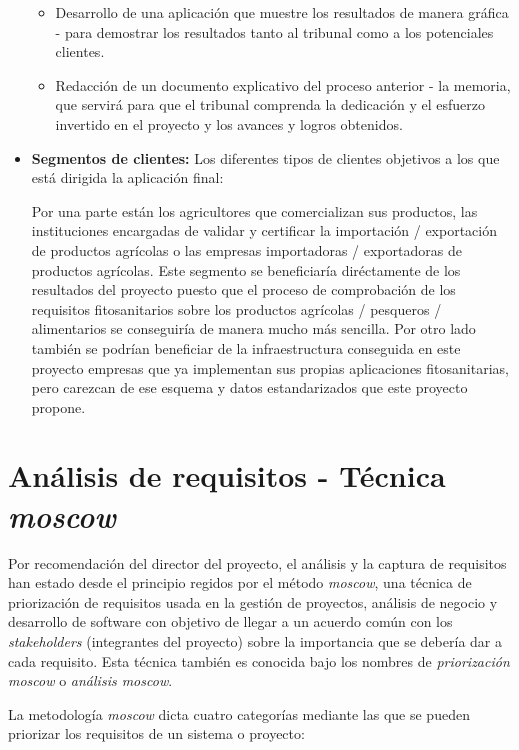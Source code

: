 \begin{itemize}
\begin{itemize}
\item Desarrollo de una aplicación que muestre los resultados de manera gráfica - para demostrar los resultados tanto al tribunal como a los potenciales clientes.
\item Redacción de un documento explicativo del proceso anterior - la memoria, que servirá para que el tribunal comprenda la dedicación y el esfuerzo invertido en el proyecto y los avances y logros obtenidos.
\end{itemize}
\item \textbf{Segmentos de clientes:} Los diferentes tipos de clientes objetivos a los que está dirigida la aplicación final: \par Por una parte están los  agricultores que comercializan sus productos, las instituciones encargadas de validar y certificar la importación / exportación  de productos agrícolas o las empresas importadoras / exportadoras de productos agrícolas. Este segmento se beneficiaría diréctamente de los resultados del proyecto puesto que el proceso de comprobación de los requisitos fitosanitarios sobre los productos agrícolas / pesqueros / alimentarios se conseguiría de manera mucho más sencilla. Por otro lado también se podrían beneficiar de la infraestructura conseguida en este proyecto empresas que ya implementan sus propias aplicaciones fitosanitarias, pero carezcan de ese esquema y datos estandarizados que este proyecto propone.



\end{itemize}


\section{Análisis de requisitos - Técnica \textit{\gls{moscow}}} \label{phytoscheme.requisitos}
\par 
Por recomendación del director del proyecto, el análisis y la captura de requisitos han estado desde el principio  regidos por el método \textit{\gls{moscow}}, una técnica de priorización de requisitos usada en la gestión de proyectos, análisis de negocio y desarrollo de software con objetivo de llegar a un acuerdo común con los \textit{stakeholders} (integrantes del proyecto) sobre la importancia que se debería dar a cada requisito. Esta técnica también es conocida bajo los nombres de \textit{priorización \gls{moscow}} o \textit{análisis \gls{moscow}}.
\par
La metodología \textit{\gls{moscow}} dicta cuatro categorías mediante las que se pueden priorizar los requisitos de un sistema o proyecto: 

